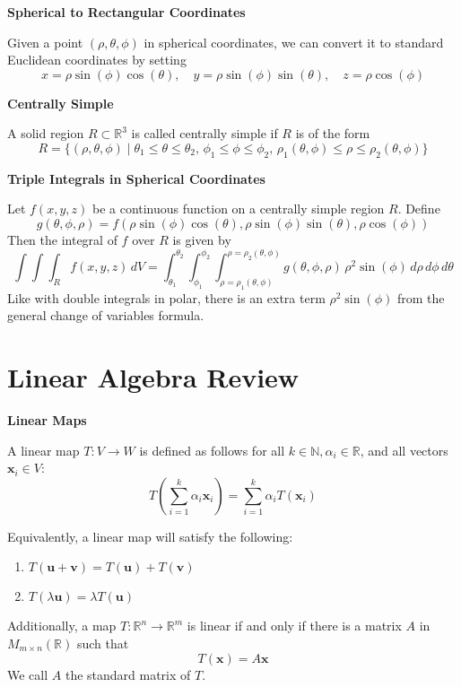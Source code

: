 \documentclass{article}
\newcommand{\R}{\mathbb{R}}
\newenvironment{definition}[1]{
    \par\noindent\textbf{#1}\par\noindent
}{
    \par \vspace{0.5cm}
}
\begin{document}
\begin{definition}{Spherical to Rectangular Coordinates}
    Given a point \( (\rho, \theta, \phi) \) in spherical coordinates, we can convert it to standard Euclidean coordinates by setting
    \[ x = \rho \sin(\phi) \cos(\theta), \quad y = \rho \sin(\phi) \sin(\theta), \quad z = \rho \cos(\phi) \]
\end{definition}

\begin{definition}{Centrally Simple}
    A solid region \( R \subset \R^3 \) is called centrally simple if \( R \) is of the form 
    \[ R = \{(\rho, \theta, \phi) \mid \theta_1 \leq \theta \leq \theta_2, \, \phi_1 \leq \phi \leq \phi_2, \, \rho_1(\theta, \phi) \leq \rho \leq \rho_2(\theta, \phi)\} \]
\end{definition}

\begin{definition}{Triple Integrals in Spherical Coordinates}
    Let \( f(x, y, z) \) be a continuous function on a centrally simple region \( R \). Define 
    \[ g(\theta, \phi, \rho) = f(\rho \sin(\phi) \cos(\theta), \rho \sin(\phi) \sin(\theta), \rho \cos(\phi)) \]
    Then the integral of \( f \) over \( R \) is given by
    \[ \int \int \int_R f(x,y,z) \, dV = \int_{\theta_1}^{\theta_2} \int_{\phi_1}^{\phi_2} \int_{\rho = \rho_1(\theta,\phi)}^{\rho = \rho_2(\theta,\phi)} g(\theta, \phi, \rho) \, \rho^2 \sin(\phi) \, d\rho \, d\phi \, d\theta \]
    Like with double integrals in polar, there is an extra term \(\rho^2 \sin(\phi)\) from the general change of variables formula. 
\end{definition}


\section*{Linear Algebra Review}

\begin{definition}{Linear Maps}
    A linear map \( T:V \to W \) is defined as follows for all \( k \in \mathbb{N}, \alpha_{i} \in \R \), and all vectors \( \bm{x}_i \in V \):
    \[ T\left(\sum\limits_{i=1}^{k}\alpha_{i}\bm{x}_{i}\right) = \sum\limits_{i=1}^{k}\alpha_{i}T(\bm{x}_{i}) \]

    Equivalently, a linear map will satisfy the following:
    \begin{enumerate}
        \renewcommand{\labelenumi}{\roman{enumi}}
        \item \( T(\bm{u} + \bm{v}) = T(\bm{u}) + T(\bm{v}) \)
        \item \( T(\lambda \bm{u}) = \lambda T(\bm{u}) \)
    \end{enumerate}

    Additionally, a map \( T : \R^n \to \R^m \) is linear if and only if there is a matrix \( A \) in \( M_{m \times n}(\R) \) such that
    \[ T(\bm{x}) = A\bm{x} \]
    We call \( A \) the standard matrix of \( T \).
\end{definition}
\end{document}

